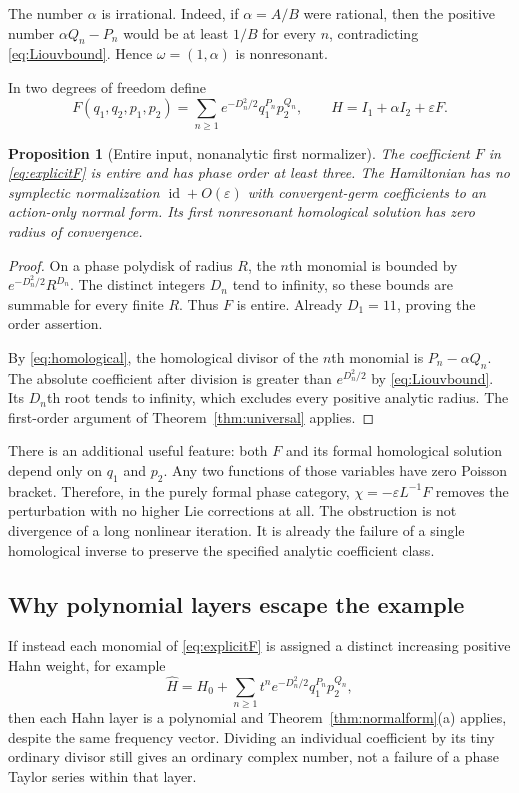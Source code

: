 \documentclass[11pt,letterpaper]{article}
\numberwithin{equation}{section}
\newtheorem{proposition}[theorem]{Proposition}
\theoremstyle{definition}
\theoremstyle{remark}
\newcommand{\id}{\operatorname{id}}
\begin{document}
The number $\alpha$ is irrational. Indeed, if $\alpha=A/B$ were rational,
then the positive number $\alpha Q_n-P_n$ would be at least $1/B$ for every
$n$, contradicting \eqref{eq:Liouvbound}. Hence $\omega=(1,\alpha)$ is
nonresonant.

In two degrees of freedom define
\begin{equation}\label{eq:explicitF}
 F(q_1,q_2,p_1,p_2)
   =\sum_{n\ge1}e^{-D_n^2/2}q_1^{P_n}p_2^{Q_n},
 \qquad H=I_1+\alpha I_2+\varepsilon F.
\end{equation}

\begin{proposition}[Entire input, nonanalytic first normalizer]
\label{prop:explicitbad}
The coefficient $F$ in \eqref{eq:explicitF} is entire and has phase order at
least three. The Hamiltonian has no symplectic normalization
$\id+O(\varepsilon)$ with convergent-germ coefficients to an action-only
normal form. Its first nonresonant homological solution has zero radius of
convergence.
\end{proposition}
\begin{proof}
On a phase polydisk of radius $R$, the $n$th monomial is bounded by
$e^{-D_n^2/2}R^{D_n}$. The distinct integers $D_n$ tend to infinity, so these
bounds are summable for every finite $R$. Thus $F$ is entire. Already
$D_1=11$, proving the order assertion.

By \eqref{eq:homological}, the homological divisor of the $n$th monomial is
$P_n-\alpha Q_n$. The absolute coefficient after division is greater than
$e^{D_n^2/2}$ by \eqref{eq:Liouvbound}. Its $D_n$th root tends to infinity,
which excludes every positive analytic radius. The first-order argument of
Theorem~\ref{thm:universal} applies.
\end{proof}

There is an additional useful feature: both $F$ and its formal homological
solution depend only on $q_1$ and $p_2$. Any two functions of those variables
have zero Poisson bracket. Therefore, in the purely formal phase category,
$\chi=-\varepsilon L^{-1}F$ removes the perturbation with no higher Lie
corrections at all. The obstruction is not divergence of a long nonlinear
iteration. It is already the failure of a single homological inverse to
preserve the specified analytic coefficient class.

\subsection{Why polynomial layers escape the example}
If instead each monomial of \eqref{eq:explicitF} is assigned a distinct
increasing positive Hahn weight, for example
\[
 \widehat H=H_0+\sum_{n\ge1}t^n
 e^{-D_n^2/2}q_1^{P_n}p_2^{Q_n},
\]
then each Hahn layer is a polynomial and Theorem~\ref{thm:normalform}(a)
applies, despite the same frequency vector. Dividing an individual
coefficient by its tiny ordinary divisor still gives an ordinary complex
number, not a failure of a phase Taylor series within that layer.
\end{document}
